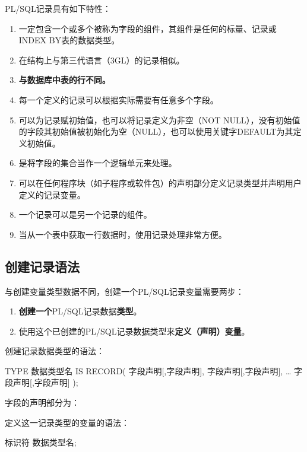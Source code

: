 \documentclass[11pt, a4paper, oneside, UTF8]{ctexbook}
\let\kaishu\relax %
\begin{document}
PL/SQL记录具有如下特性：
\begin{enumerate}
  \item 一定包含一个或多个被称为字段的组件，其组件是任何的标量、记录或INDEX BY表的数据类型。
  \item 在结构上与第三代语言（3GL）的记录相似。
  \item {\bfseries\kaishu 与数据库中表的行不同。}
  \item 每一个定义的记录可以根据实际需要有任意多个字段。
  \item 可以为记录赋初始值，也可以将记录定义为非空（NOT NULL），没有初始值的字段其初始值被初始化为空（NULL），也可以使用关键字DEFAULT为其定义初始值。
  \item 是将字段的集合当作一个逻辑单元来处理。
  \item 可以在任何程序块（如子程序或软件包）的声明部分定义记录类型并声明用户定义的记录变量。
  \item 一个记录可以是另一个记录的组件。
  \item 当从一个表中获取一行数据时，使用记录处理非常方便。
\end{enumerate}

\subsection{创建记录语法}
与创建变量类型数据不同，创建一个PL/SQL记录变量需要两步：
\begin{enumerate}
  \item {\bfseries\kaishu 创建一个}PL/SQL记录数据{\bfseries\kaishu 类型}。
  \item 使用这个已创建的PL/SQL记录数据类型来{\bfseries\kaishu 定义（声明）变量}。
\end{enumerate}

创建记录数据类型的语法：
\begin{plsql}[caption=创建记录类型的语法]
TYPE 数据类型名 IS RECORD(
  字段声明[,字段声明],
  字段声明[,字段声明],
  …
  字段声明[,字段声明]
);
\end{plsql}

字段的声明部分为：

定义这一记录类型的变量的语法：
\begin{plsql}[caption=定义变量]
  标识符 数据类型名;
\end{plsql}
\end{document}
